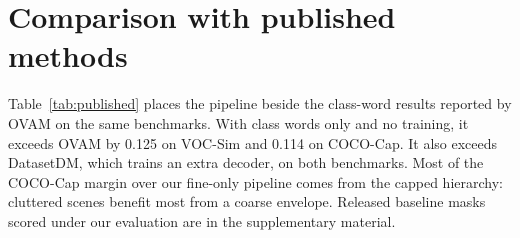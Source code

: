 \section{Comparison with published methods}
\label{sec:comparison}
Table~\ref{tab:published} places the pipeline beside the class-word results reported by OVAM on the same benchmarks. With class words only and no training, it exceeds OVAM by 0.125 on VOC-Sim and 0.114 on COCO-Cap. It also exceeds DatasetDM, which trains an extra decoder, on both benchmarks. Most of the COCO-Cap margin over our fine-only pipeline comes from the capped hierarchy: cluttered scenes benefit most from a coarse envelope. Released baseline masks scored under our evaluation are in the supplementary material.


